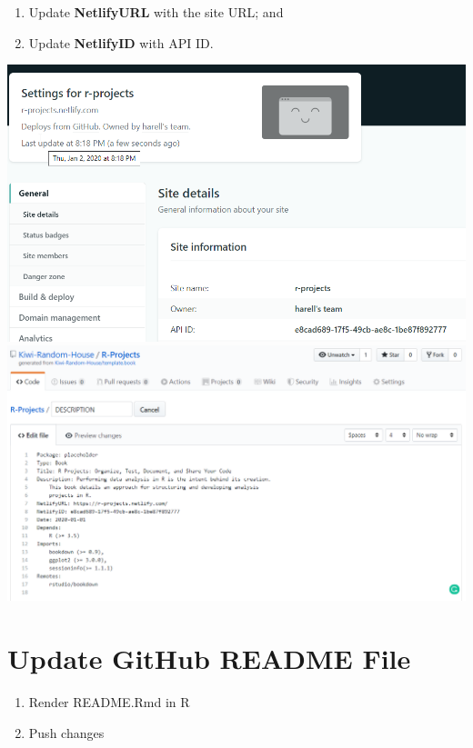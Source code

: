 \documentclass[]{book}
\providecommand{\tightlist}{%
  \setlength{\itemsep}{0pt}\setlength{\parskip}{0pt}}
\begin{document}
\begin{enumerate}
\def\labelenumi{\arabic{enumi}.}
\tightlist
\item
  Update \textbf{NetlifyURL} with the site URL; and
\item
  Update \textbf{NetlifyID} with API ID.
\end{enumerate}

\begin{center}\includegraphics[width=0.7\linewidth]{images/0d6fe5708049ecd979b23cc75c2ff9dc} \includegraphics[width=0.7\linewidth]{images/63fd32aaaf30f529e9f1e458e18fbd87} \end{center}

\hypertarget{update-github-readme-file}{%
\section{Update GitHub README File}\label{update-github-readme-file}}

\begin{enumerate}
\def\labelenumi{\arabic{enumi}.}
\tightlist
\item
  Render README.Rmd in R
\item
  Push changes
\end{enumerate}
\end{document}
